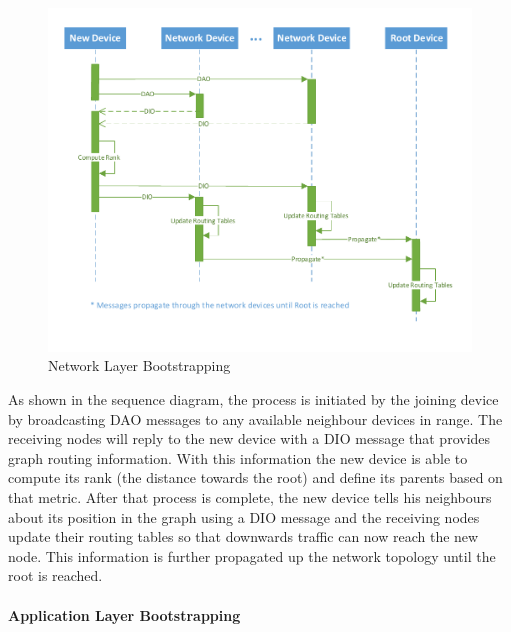 \begin{figure}[h]
  \centering
  \includegraphics[width=1.0\linewidth]{figures/Sequence_Network_Admission.pdf}
  \caption{Network Layer Bootstrapping}
  \label{fig:sequence_network_admission}
\end{figure}

As shown in the sequence diagram, the process is initiated by the joining device by broadcasting \gls{DAO} messages to any available neighbour devices in range. The receiving nodes will reply to the new device with a \gls{DIO} message that provides graph routing information. With this information the new device is able to compute its rank (the distance towards the root) and define its parents based on that metric. After that process is complete, the new device tells his neighbours about its position in the graph using a \gls{DIO} message and the receiving nodes update their routing tables so that downwards traffic can now reach the new node. This information is further propagated up the network topology until the root is reached.

\vspace{20mm} %

\paragraph{\textbf{Application Layer Bootstrapping}}
\paragraph{}

